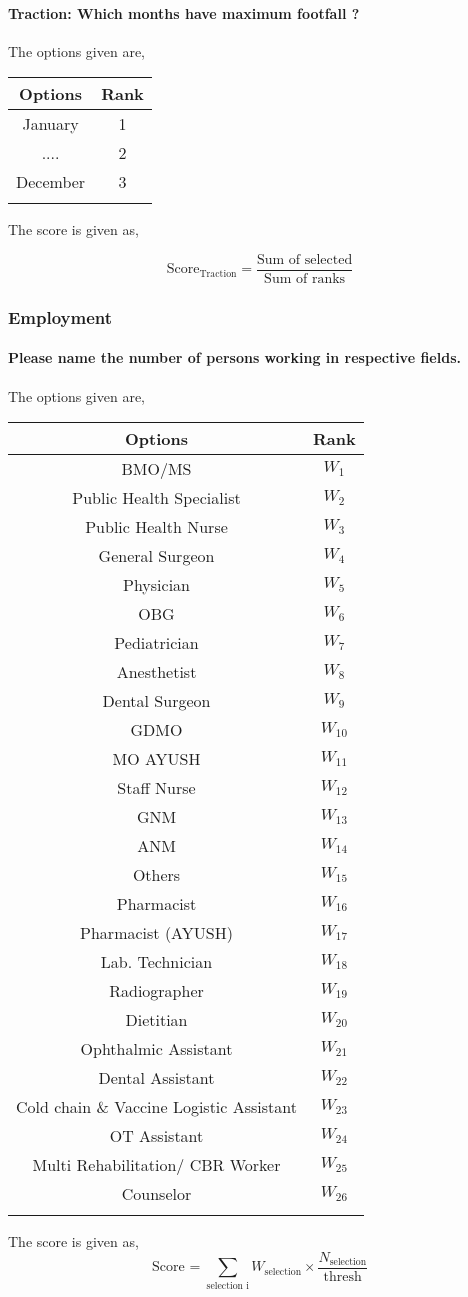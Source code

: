 \documentclass[oneside]{article}
\newcommand{\tsub}[2]{\text{#1}_{\text{#2}}}
\newcommand{\tsubb}[2]{#1_{\text{#2}}}
\newcommand{\dsub}[2]{\dfrac{\text{#1}}{\text{#2}}}
\newcommand{\multsel}[1]
{
	\[
		\tsub{Score}{#1} = \dsub{Sum of selected}{Sum of ranks}
	\]
}
\newenvironment{ttable}
{
\begin{center}
\begin{tabular}{c|c}
\hline
}
{
\\ \hline
\end{tabular}
\end{center}
}
\begin{document}
\paragraph{Traction: Which months have maximum footfall ?}

The options given are,
\begin{ttable}
Options & Rank \\ \hline
January & 1 \\
 ....  & 2 \\
December & 3 \\
\hline
\end{ttable}
The score is given as,
\multsel{Traction}
\subsubsection{Employment}

\paragraph{ Please name the number of persons working in respective fields.}
The options given are,
\begin{ttable}
Options & Rank \\ \hline
BMO/MS & $W_1$ \\
Public Health Specialist & $W_2$ \\
Public Health Nurse & $W_3$ \\
General Surgeon & $W_4$ \\
Physician & $W_5$ \\
OBG & $W_6$ \\
Pediatrician & $W_7$ \\
Anesthetist & $W_8$ \\
Dental Surgeon & $W_9$ \\
	GDMO & $W_{10}$ \\
	MO AYUSH & $W_{11}$ \\
	Staff Nurse & $W_{12}$ \\
	GNM & $W_{13}$ \\
	ANM & $W_{14}$ \\
	Others & $W_{15}$ \\
	Pharmacist & $W_{16}$ \\
	Pharmacist (AYUSH) & $W_{17}$ \\
	Lab. Technician & $W_{18}$ \\
	Radiographer & $W_{19}$ \\
	Dietitian & $W_{20}$ \\
	Ophthalmic Assistant & $W_{21}$ \\
	Dental Assistant & $W_{22}$ \\
	Cold chain \& Vaccine Logistic Assistant & $W_{23}$ \\
	OT Assistant & $W_{24}$ \\
	Multi Rehabilitation/ CBR Worker & $W_{25}$ \\
	Counselor & $W_{26}$ \\
\hline
\end{ttable}
The score is given as,
\[
	\tsub{Score}{} = \sum_{\text{selection i}} \tsubb{W}{selection} \times \dfrac{\tsubb{N}{selection}}{\text{thresh}}
\]
\end{document}
